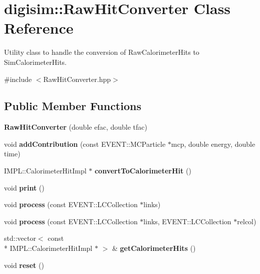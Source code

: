\section{digisim\-:\-:Raw\-Hit\-Converter Class Reference}
\label{classdigisim_1_1RawHitConverter}


Utility class to handle the conversion of Raw\-Calorimeter\-Hits to Sim\-Calorimeter\-Hits.  




{\ttfamily \#include $<$Raw\-Hit\-Converter.\-hpp$>$}

\subsection*{Public Member Functions}
\begin{DoxyCompactItemize}
\item 
{\bfseries Raw\-Hit\-Converter} (double efac, double tfac)\label{classdigisim_1_1RawHitConverter_a909d99a1ec330661c8e02304f0602f1c}

\item 
void {\bfseries add\-Contribution} (const E\-V\-E\-N\-T\-::\-M\-C\-Particle $\ast$mcp, double energy, double time)\label{classdigisim_1_1RawHitConverter_a92cce974213a6c44606df731df7c4774}

\item 
I\-M\-P\-L\-::\-Calorimeter\-Hit\-Impl $\ast$ {\bfseries convert\-To\-Calorimeter\-Hit} ()\label{classdigisim_1_1RawHitConverter_a6b701f2a3f8c2d5feb97d5edbc986c53}

\item 
void {\bfseries print} ()\label{classdigisim_1_1RawHitConverter_ab9644b8058f73652976d5f46fe9b531e}

\item 
void {\bfseries process} (const E\-V\-E\-N\-T\-::\-L\-C\-Collection $\ast$links)\label{classdigisim_1_1RawHitConverter_abfb84ba443d5b31266cb1ea69233bc0e}

\item 
void {\bfseries process} (const E\-V\-E\-N\-T\-::\-L\-C\-Collection $\ast$links, E\-V\-E\-N\-T\-::\-L\-C\-Collection $\ast$relcol)\label{classdigisim_1_1RawHitConverter_a0d58fb0019e6bc609a8f4c898f77ffe8}

\item 
std\-::vector$<$ const \\*
I\-M\-P\-L\-::\-Calorimeter\-Hit\-Impl $\ast$ $>$ \& {\bfseries get\-Calorimeter\-Hits} ()\label{classdigisim_1_1RawHitConverter_a5b146d8a5f1a24ed89f7a015668728c4}

\item 
void {\bfseries reset} ()\label{classdigisim_1_1RawHitConverter_a17b8e571f1047c902983dfc2c720f717}

\end{DoxyCompactItemize}
